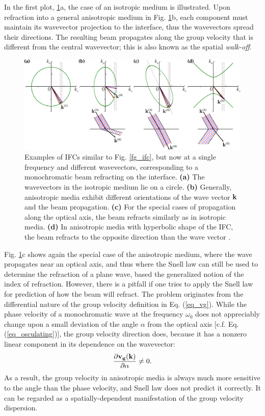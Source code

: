 In the first plot, \ref{fg_ifc2}a, the case of an isotropic medium is illustrated. Upon refraction into a general anisotropic medium in Fig. \ref{fg_ifc2}b, each component must maintain its wavevector projection to the interface, thus the wavevectors spread their directions. The resulting beam propagates along the group velocity that is different from the central wavevector; %
this is also known as the spatial \textit{walk-off}.
\begin{figure}[ht] \caption{Examples of IFCs similar to Fig. \ref{fg_ifc}, but now at a single frequency and different wavevectors, corresponding to a monochromatic beam refracting on the interface. \textbf{(a)} The wavevectors in the isotropic medium lie on a circle.
		\textbf{(b)} Generally, anisotropic media exhibit different orientations of the wave vector ${\mathbf{k}}$ and the beam propagation. \textbf{(c)} For the special cases of propagation along the optical axis, the beam refracts similarly as in isotropic media.
	\textbf{(d)} In anisotropic media with hyperbolic shape of the IFC, the beam refracts to the opposite direction than the wave vector \cite{lindell2001bw}. } \label{fg_ifc2} \centering 
	\includegraphics[width=\textwidth]{img/ifc_kdispersion_hyp.pdf} 
\end{figure}

Fig. \ref{fg_ifc2}c shows again the special case of the anisotropic medium, where the wave propagates near an optical axis, and thus where the Snell law can still be used to determine the refraction of a plane wave, based the generalized notion of the index of refraction.
However, there is a pitfall if one tries to apply the Snell law for prediction of how the beam will refract. The problem originates from the differential nature of the group velocity definition in Eq. (\ref{eq_vg}). 
While the phase velocity of a monochromatic wave at the frequency $\omega_0$ does not appreciably change upon a small deviation of the angle $\alpha$ from the optical axis  [c.f.  Eq. (\ref{eq_osculating})], the group velocity direction does, because it has a nonzero linear component in its dependence on the wavevector:
$$ \frac{\partial {\mathbf{v_g}}({\mathbf{k}})}{\partial \alpha} \neq 0.$$
As a result, the group velocity in anisotropic media is always much more sensitive to the angle than the phase velocity, and Snell law does not predict it correctly. It can be regarded as a spatially-dependent manifestation of the group velocity dispersion.

